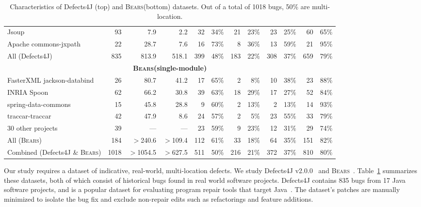 \documentclass[10pt, conference]{IEEEtran}
\newcommand\bears{\textsc{Bears}\xspace}
\begin{document}
\begin{table}
\begin{center}
\begin{tabular}{l  rrr | rr | rr | rr | rr }
Jsoup & 93 & 7.9 & 2.2 & 32 & 34\% & 21 & 23\% & 23 & 25\% & 60 & 65\% \\
Apache commons-jxpath & 22 & 28.7 & 7.6 & 16 & 73\% & 8 & 36\% & 13 & 59\% & 21 & 95\% \\
\midrule
All (Defects4J) & 835 & 813.9 & 518.1 & 399 & 48\% & 183 & 22\% & 308 & 37\% & 659 & 79\%\\
\midrule
\multicolumn{12}{c}{\textbf{\bears (single-module)}} \\
\midrule
FasterXML jackson-databind & 26 & 80.7 & 41.2 & 17 & 65\% & 2 & 8\% & 10 & 38\% & 23 & 88\% \\
INRIA Spoon & 62 & 66.2 & 30.8  & 39 & 63\% & 18 & 29\% & 17 & 27\% & 52 & 84\% \\
spring-data-commons & 15 & 45.8 & 28.8  & 9 & 60\% & 2 & 13\% & 2 & 13\% & 14 & 93\% \\
traccar-traccar & 42 & 47.9 & 8.6 & 24 & 57\% & 2 & 5\% & 23 & 55\% & 33 & 79\% \\
30 other projects & 39 & --- & --- & 23 & 59\% & 9 & 23\% & 12 & 31\% & 29 & 74\% \\
\midrule
All (\bears) & 184 & $>$240.6 & $>$109.4 & 112 & 61\% & 33 & 18\% & 64 & 35\% & 151 & 82\% \\
\midrule
Combined (Defects4J \& \bears) & 1018 & $>$1054.5 & $>$627.5 & 511 & 50\% & 216 & 21\% & 372 & 37\% & 810 & 80\%\\
\bottomrule
\end{tabular}
\end{center}
\caption{\label{tab:dataset-characteristics} Characteristics of Defects4J
  (top) and \bears (bottom) datasets.
  Out of a total of 1018 bugs, 50\% are multi-location.
  }
\end{table}

Our study requires a dataset of indicative, real-world,
multi-location defects.  We study 
Defects4J v2.0.0~\cite{defects4j} and \bears~\cite{bears}.  Table~\ref{tab:dataset-characteristics}
summarizes these datasets, both of which
consist of historical
bugs found in real world software projects. Defects4J contains 835 bugs from 
17 Java software projects, and is a popular dataset for evaluating 
program repair tools that target 
Java~\cite{durieux-repair-them-all,pearson2017evaluating,saha2017elixir,saha2019harnessing,xin2017leveraging,b2016learning}.
The dataset's patches are manually minimized to isolate the bug fix 
and exclude non-repair edits such as refactorings and feature additions.
\end{document}
